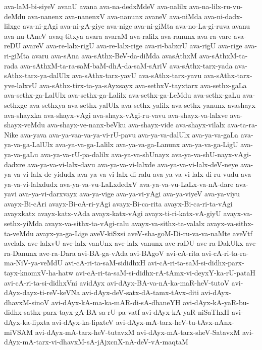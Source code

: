 {ava-laM-bi-siyeV
avanU
avana
ava-na-dedxMdeV
ava-nalilx
ava-na-lilx-ru-vu-deMdu
ava-nanenx
ava-nanenxV
ava-nanunx
avaneV
ava-niMda
ava-ni-dadx-lilxge
ava-ni-gAgi
ava-ni-gA-giye
ava-nige
ava-ni-giMta
ava-no-La-gi-ruva
avanu
ava-nu-tAneV
avaq-titxya
avara
avaraM
ava-ralilx
ava-ranunx
ava-ra-vare
ava-reDU
avareV
ava-re-lalx-rigU
ava-re-lalx-rige
ava-ri-babxrU
ava-rigU
ava-rige
ava-ri-giMta
avaru
ava-sAna
ava-sAthx-BeV-da-diMda
avasAthxM
ava-sAthxM-ta-rada
ava-sAthxM-ta-ra-saM-baM-dhA-da-saM-sAriV
ava-sAthx-tarx-yada
ava-sAthx-tarx-ya-dalUlx
ava-sAthx-tarx-yavU
ava-sAthx-tarx-yavu
ava-sAthx-tarx-yve-lalxvU
ava-sAthx-tirx-ta-ya-sAyxsayx
ava-sethxV-tayxtarx
ava-sethx-gaLa
ava-sethx-ga-LalUlx
ava-sethx-ga-Lalilx
ava-sethx-ga-LeMdu
ava-sethx-gaLu
ava-sethxge
ava-sethxya
ava-sethx-yalUlx
ava-sethx-yalilx
ava-sethx-yanunx
avashayx
ava-shayxka
ava-shayx-vAgi
ava-shayx-vAgi-ru-vavu
ava-shayx-va-lalxve
ava-shayx-veMdu
ava-shayx-ve-nanx-beVku
ava-shayx-vide
ava-shayx-vilalx
ava-ta-ra-Nike
ava-yava
ava-ya-vaa-va-ya-vi-rU-pavu
ava-ya-va-dalUlx
ava-ya-va-gaLa
ava-ya-va-ga-LalUlx
ava-ya-va-ga-Lalilx
ava-ya-va-ga-Lanunx
ava-ya-va-ga-LigU
ava-ya-va-gaLu
ava-ya-va-rU-pa-dalilx
ava-ya-va-shUnayx
ava-ya-va-shU-nayx-vAgi-dadxre
ava-ya-va-vi-lalx-davu
ava-ya-va-vi-lalxde
ava-ya-va-vi-lalx-deV-neye
ava-ya-va-vi-lalx-de-yidudx
ava-ya-va-vi-lalx-di-ralu
ava-ya-va-vi-lalx-di-ru-vudu
ava-ya-va-vi-lalxdudx
ava-ya-va-vu-LaLxdedxV
ava-ya-va-vu-LaLx-va-nA-dare
ava-yavi
ava-ya-vi-darxvayx
ava-ya-vige
ava-ya-vi-yAgi
ava-ya-viyeV
ava-ya-viyu
avayx-Bi-cAri
avayx-Bi-cA-ri-yAgi
avayx-Bi-ca-rita
avayx-Bi-ca-ri-ta-vAgi
avayxkatx
avayx-katx-vAda
avayx-katx-vAgi
avayx-ti-ri-katx-vA-giyU
avayx-va-sethx-yiMda
avayx-va-sithx-ta-vAgi-ralu
avayx-va-sithx-ta-valalx
avayx-va-sithx-ta-veMdu
avayx-ya-ga-Lige
aveV-kiSxsi
aveV-sha-goM-Di-ru-va-va-naMte
aveVtf
avelalx
ave-lalxvU
ave-lalx-vanUnx
ave-lalx-vanunx
ave-raDU
ave-ra-DakUkx
ave-ra-Danunx
ave-ra-Dara
avi-BA-ga-vAda
avi-BAgoV
avi-cA-rita
avi-cA-ri-ta-ra-ma-NiV-ya-veMdU
avi-cA-ri-ta-saM-sididhxH
avi-cA-ri-ta-saM-si-didhx-parx-tayx-knomxV-ha-hatw
avi-cA-ri-ta-saM-si-didhx-rA-tAmx-vi-deyxY-ka-rU-pataH
avi-cA-ri-ta-si-didhxVni
avidAyx
avi-dAyx-BA-va-nA-ka-maR-heV-tutoV
avi-dAyx-dayx-ti-reV-keVNa
avi-dAyx-deV-satx-dA-tamx-tAvx-diti
avi-dAyx-dhavxM-sinoV
avi-dAyx-kA-ma-ka-mAR-di-sA-dhaneYH
avi-dAyx-kA-yaR-bu-didhx-sathx-parx-tayx-gA-BA-sa-rU-pa-vatf
avi-dAyx-kA-yaR-niSaThxH
avi-dAyx-ka-lipxta
avi-dAyx-ka-lipxteV
avi-dAyx-mA-tarx-heV-tu-tAvx-nAnx-miVSAM
avi-dAyx-mA-tarx-heV-tutavxM
avi-dAyx-mA-tarx-sheV-SatavxM
avi-dAyx-mA-tarx-vi-dhavxM-sA-jAjxcnX-nA-deV-vA-maqtaM
}

